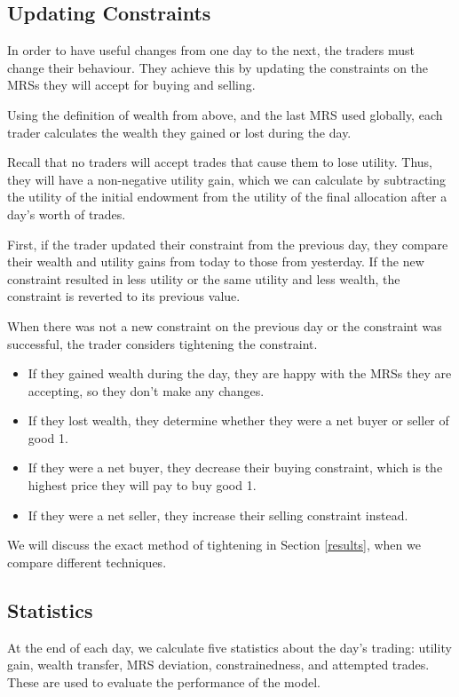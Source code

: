 \documentclass[12pt,a4paper,titlepage]{article}
\begin{document}
\subsection{Updating Constraints}
In order to have useful changes from one day to the next, the traders must change their behaviour.
They achieve this by updating the constraints on the MRSs they will accept for buying and selling.

Using the definition of wealth from above, and the last MRS used globally, each trader calculates the wealth they gained or lost during the day.

Recall that no traders will accept trades that cause them to lose utility. 
Thus, they will have a non-negative utility gain, which we can calculate by subtracting the utility of the initial endowment from the utility of the final allocation after a day's worth of trades.

First, if the trader updated their constraint from the previous day, they compare their wealth and utility gains from today to those from yesterday.
If the new constraint resulted in less utility or the same utility and less wealth, the constraint is reverted to its previous value.

When there was not a new constraint on the previous day or the constraint was successful, the trader considers tightening the constraint.
\begin{itemize}
  \item If they gained wealth during the day, they are happy with the MRSs they are accepting, so they don't make any changes.
  \item If they lost wealth, they determine whether they were a net buyer or seller of good 1.
  \item If they were a net buyer, they decrease their buying constraint, which is the highest price they will pay to buy good 1.
  \item If they were a net seller, they increase their selling constraint instead.
\end{itemize}


We will discuss the exact method of tightening in Section \ref{results}, when we compare different techniques.

\subsection{Statistics}
At the end of each day, we calculate five statistics about the day's trading: utility gain, wealth transfer, MRS deviation, constrainedness, and attempted trades.
These are used to evaluate the performance of the model.
\end{document}
